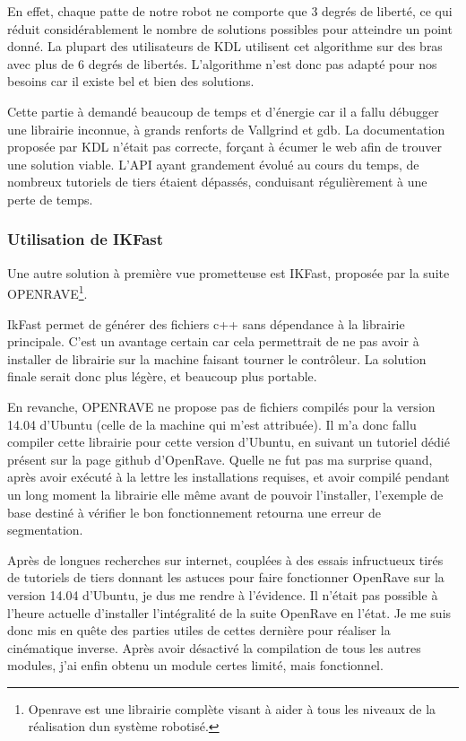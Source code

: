 \documentclass{tnreport}
\begin{document}
En effet, chaque patte de notre robot ne comporte que 3 degrés de liberté, ce qui réduit considérablement le nombre de solutions possibles pour atteindre un point donné. La plupart des utilisateurs de KDL utilisent cet algorithme sur des bras avec plus de 6 degrés de libertés. L'algorithme n'est donc pas adapté pour nos besoins car il existe bel et bien des solutions.

Cette partie à demandé beaucoup de temps et d'énergie car il a fallu débugger une librairie inconnue, à grands renforts de Vallgrind et gdb. La documentation proposée par KDL n'était pas correcte, forçant à écumer le web afin de trouver une solution viable. L'API ayant grandement évolué au cours du temps, de nombreux tutoriels de tiers étaient dépassés, conduisant régulièrement à une perte de temps. 

\subsubsection{Utilisation de IKFast}
Une autre solution à première vue prometteuse est IKFast, proposée par la suite \gls{OPENRAVE}\footnote{Openrave est une librairie complète visant à aider à tous les niveaux de la réalisation dun système robotisé.}. 

IkFast permet de générer des fichiers c++ sans dépendance à la librairie principale. C'est un avantage certain car cela permettrait de ne pas avoir à installer de librairie sur la machine faisant tourner le contrôleur. La solution finale serait donc plus légère, et beaucoup plus portable.

En revanche, OPENRAVE ne propose pas de fichiers compilés pour la version 14.04 d'Ubuntu (celle de la machine qui m'est attribuée). Il m'a donc fallu compiler cette librairie pour cette version d'Ubuntu, en suivant un tutoriel dédié présent sur la page github d'OpenRave. Quelle ne fut pas ma surprise quand, après avoir exécuté à la lettre les installations requises, et avoir compilé pendant un long moment la librairie elle même avant de pouvoir l'installer, l'exemple de base destiné à vérifier le bon fonctionnement retourna une erreur de segmentation.

Après de longues recherches sur internet, couplées à des essais infructueux tirés de tutoriels de tiers donnant les astuces pour faire fonctionner OpenRave sur la version 14.04 d'Ubuntu, je dus me rendre à l'évidence. Il n'était pas possible à l'heure actuelle d'installer l'intégralité de la suite OpenRave en l'état. Je me suis donc mis en quête des parties utiles de cettes dernière pour réaliser la cinématique inverse. Après avoir désactivé la compilation de tous les autres modules, j'ai enfin obtenu un module certes limité, mais fonctionnel.
\end{document}
